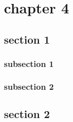 \chapter{chapter 4}
\section{section 1}
\subsection{subsection 1}
\subsection{subsection 2}
\section{section 2}